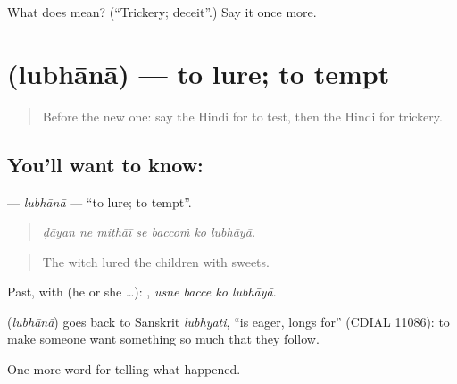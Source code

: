 \begin{tcolorbox}[breakable,colback=teal!4,colframe=teal!35!black,title={Before you move on}]
What does  mean? (\textquotedblleft{}Trickery; deceit\textquotedblright{}.) Say it once more.
\end{tcolorbox}
\section[\texorpdfstring{\hi{लुभाना} (lubhānā)}{लुभाना (lubhānā)}]{ (lubhānā) — to lure; to tempt}

\label{lesson:HI-C339-lubhana}



\begin{quote}
Before the new one: say the Hindi for to test, then the Hindi for trickery.
\end{quote}

\subsection*{You'll want to know: }
\textbf{} — \emph{lubhānā} — \textquotedblleft{}to lure; to tempt\textquotedblright{}.

\begin{quote}
      
\end{quote}

\begin{quote}
\emph{ḍāyan ne miṭhāī se baccoṁ ko lubhāyā.}
\end{quote}

\begin{quote}
The witch lured the children with sweets.
\end{quote}

Past, with  (he or she …):    , \emph{usne bacce ko lubhāyā}.

\begin{cousinweb}
\textbf{} (\emph{lubhānā}) goes back to Sanskrit \emph{lubhyati}, \textquotedblleft{}is eager, longs for\textquotedblright{} (CDIAL 11086): to make someone want something so much that they follow.
\end{cousinweb}

\begin{grammarlens}[title={What you've built}]
One more word for telling what happened.
\end{grammarlens}

